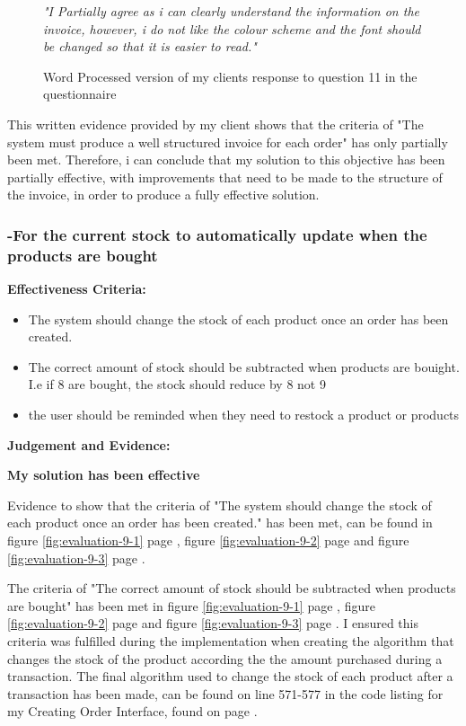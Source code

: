 \begin{figure}[H]
\caption{Word Processed version of my clients response to question 11 in the questionnaire}
\vspace{3mm}
\textit{\large{"I Partially agree as i can clearly understand the information on the invoice, however, i do not like the colour scheme and the font should be changed so that it is easier to read."}}
\vspace{3mm}
\end{figure}

This written evidence provided by my client shows that the criteria of "The system must produce a well structured invoice for each order" has only partially been met. Therefore, i can conclude that my solution to this objective has been partially effective, with improvements that need to be made to the structure of the invoice, in order to produce a fully effective solution.




\pagebreak
\subsubsection{-For the current stock to automatically update when the products are bought}

\textbf{Effectiveness Criteria:}\newline
\begin{itemize}
	\item{The system should change the stock of each product once an order has been created.}
	\item{The correct amount of stock should be subtracted when products are bouight. I.e if 8 are bought, the stock should reduce by 8 not 9}
	\item {the user should be reminded when they need to restock a product or products}
\end{itemize}

\textbf{Judgement and Evidence:} \newline

\textbf{\large{My solution has been effective}}

Evidence to show that the criteria of "The system should change the stock of each product once an order has been created." has been met, can be found in figure \ref{fig:evaluation-9-1} page \pageref{fig:evaluation-9-1}, figure \ref{fig:evaluation-9-2} page \pageref{fig:evaluation-9-2} and figure \ref{fig:evaluation-9-3} page \pageref{fig:evaluation-9-3}. 

The criteria of "The correct amount of stock should be subtracted when products are bought" has been met in figure \ref{fig:evaluation-9-1} page \pageref{fig:evaluation-9-1}, figure \ref{fig:evaluation-9-2} page \pageref{fig:evaluation-9-2} and figure \ref{fig:evaluation-9-3} page \pageref{fig:evaluation-9-3}.  I ensured this criteria was fulfilled during the implementation when creating the algorithm that changes the stock of the product according the the amount purchased during a transaction. The final algorithm used to change the stock of each product after a transaction has been made, can be found on line 571-577 in the code listing for my Creating Order Interface, found on page \pageref{order}.

